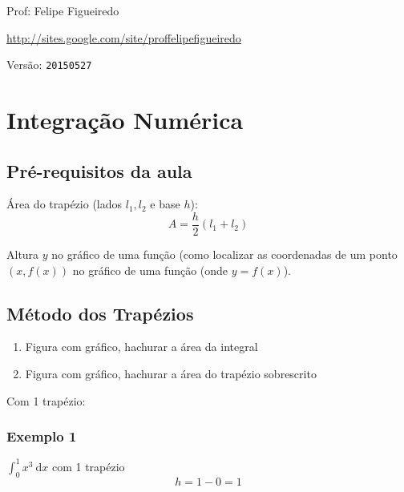 \documentclass[a4paper]{article}
\newcommand{\ud}{\mathrm{\ d}}
\begin{document}
\parbox[c]{.825\textwidth}{\raggedright%
{Prof: Felipe Figueiredo\par}
{\url{http://sites.google.com/site/proffelipefigueiredo}\par}
}

Versão: \verb|20150527|



\section*{Integração Numérica}

\subsection*{Pré-requisitos da aula}

Área do trapézio (lados $l_1,l_2$ e base $h$):
\begin{displaymath}
  A = \frac{h}{2}(l_1+l_2)
\end{displaymath}

Altura $y$ no gráfico de uma função (como localizar as coordenadas de
um ponto $(x,f(x))$ no gráfico de uma função (onde $y=f(x)$).

\subsection*{Método dos Trapézios}

\begin{enumerate}
\item Figura com gráfico, hachurar a área da integral
\item Figura com gráfico, hachurar a área do trapézio sobrescrito
\end{enumerate}

Com 1 trapézio:
\subsubsection*{Exemplo 1}

$\int_0^1 x^3 \ud x$ com 1 trapézio
\begin{displaymath}
  h = 1-0=1
\end{displaymath}
\end{document}
